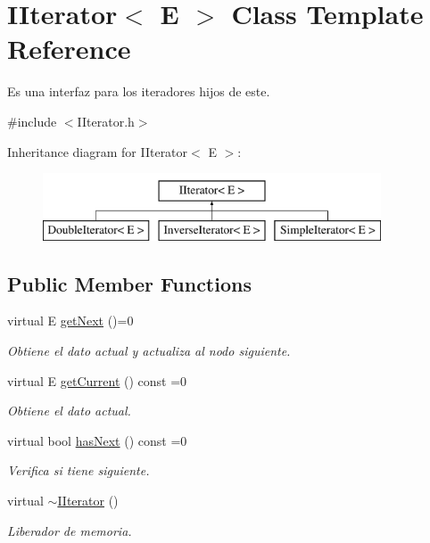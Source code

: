 \hypertarget{class_i_iterator}{\section{I\-Iterator$<$ E $>$ Class Template Reference}
\label{class_i_iterator}
}


Es una interfaz para los iteradores hijos de este.  




{\ttfamily \#include $<$I\-Iterator.\-h$>$}

Inheritance diagram for I\-Iterator$<$ E $>$\-:\begin{figure}[H]
\begin{center}
\leavevmode
\includegraphics[height=2.000000cm]{class_i_iterator}
\end{center}
\end{figure}
\subsection*{Public Member Functions}
\begin{DoxyCompactItemize}
\item 
virtual E \hyperlink{class_i_iterator_ab1b13434e4fac20c74262dee51d1e870}{get\-Next} ()=0
\begin{DoxyCompactList}\small\item\em Obtiene el dato actual y actualiza al nodo siguiente. \end{DoxyCompactList}\item 
virtual E \hyperlink{class_i_iterator_a50f55ce1381378aad2c93f16c9b60822}{get\-Current} () const =0
\begin{DoxyCompactList}\small\item\em Obtiene el dato actual. \end{DoxyCompactList}\item 
virtual bool \hyperlink{class_i_iterator_a8a73f0fb41a66fe98e5e636378759196}{has\-Next} () const =0
\begin{DoxyCompactList}\small\item\em Verifica si tiene siguiente. \end{DoxyCompactList}\item 
virtual \hyperlink{class_i_iterator_a46e00fa31d4f8d29232f4b1dfc27026b}{$\sim$\-I\-Iterator} ()
\begin{DoxyCompactList}\small\item\em Liberador de memoria. \end{DoxyCompactList}\end{DoxyCompactItemize}


